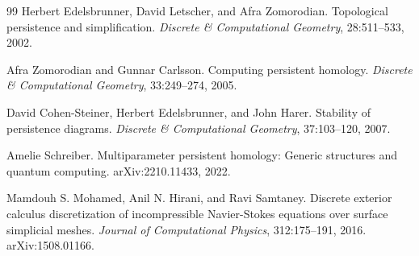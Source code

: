 \documentclass[10pt]{article}
\theoremstyle{definition}
\theoremstyle{plain}
\theoremstyle{remark}
\begin{document}
\begin{thebibliography}{99}
Herbert Edelsbrunner, David Letscher, and Afra Zomorodian.
\newblock Topological persistence and simplification.
\newblock \emph{Discrete \& Computational Geometry}, 28:511--533, 2002.

Afra Zomorodian and Gunnar Carlsson.
\newblock Computing persistent homology.
\newblock \emph{Discrete \& Computational Geometry}, 33:249--274, 2005.

David Cohen-Steiner, Herbert Edelsbrunner, and John Harer.
\newblock Stability of persistence diagrams.
\newblock \emph{Discrete \& Computational Geometry}, 37:103--120, 2007.

Amelie Schreiber.
\newblock Multiparameter persistent homology: Generic structures and quantum computing.
\newblock arXiv:2210.11433, 2022.

Mamdouh S. Mohamed, Anil N. Hirani, and Ravi Samtaney.
\newblock Discrete exterior calculus discretization of incompressible Navier-Stokes equations over surface simplicial meshes.
\newblock \emph{Journal of Computational Physics}, 312:175--191, 2016. arXiv:1508.01166.

\end{thebibliography}
\end{document}
